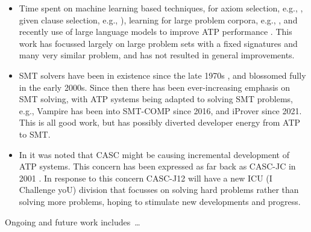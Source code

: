 \documentclass[runningheads]{llncs}
\begin{document}
\begin{itemize}
\item Time spent on machine learning based techniques, for 
      axiom selection, e.g., \cite{Urb06,KB14}, 
      given clause selection, e.g., \cite{JU17-CICM,CA+21,AA+22-ML,MS23}), 
      learning for large problem corpora, e.g., \cite{KM+14,JU19,BL+19-ICML}, 
      and recently use of large language models to improve ATP performance \cite{WX+23,AS+23}.
      This work has focussed largely on large problem sets with a fixed signatures and many
      very similar problem, and has not resulted in general improvements.
\item SMT solvers have been in existence since the late 1970s \cite{NO79}, and blossomed fully
      in the early 2000s.
      Since then there has been ever-increasing emphasis on SMT solving, with ATP systems being 
      adapted to solving SMT problems, e.g., Vampire has been into SMT-COMP since 2016, and
      iProver since 2021.
      This is all good work, but has possibly diverted developer energy from ATP to SMT.
\item In \cite{SD24-CASC} it was noted that CASC might be causing incremental development of ATP
      systems.
      This concern has been expressed as far back as CASC-JC in 2001 \cite{PSS02}.
      In response to this concern CASC-J12 will have a new ICU (I Challenge yoU) division that
      focusses on solving hard problems rather than solving more problems, hoping to stimulate
      new developments and progress.
\end{itemize}

Ongoing and future work includes~\ldots



\end{document}
